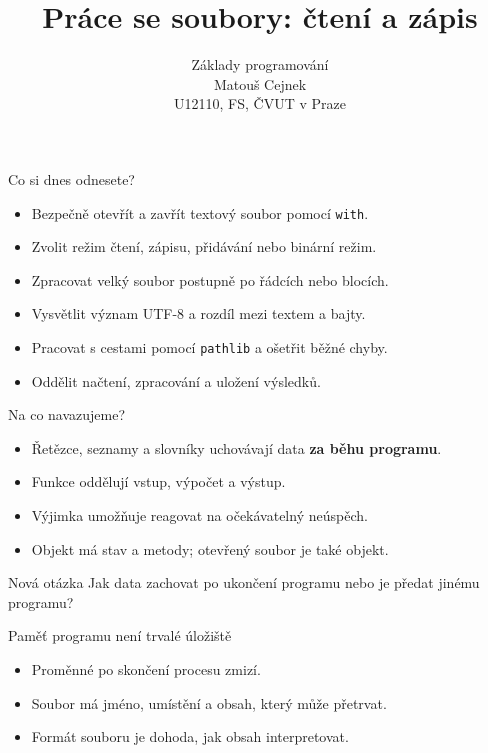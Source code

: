 \documentclass[aspectratio=169]{beamer}
\title{Práce se soubory: čtení a zápis}
\subtitle{Základy programování\\Matouš Cejnek\\U12110, FS, ČVUT v Praze}
\author{}
\institute{}
\date{}
\newcommand{\term}[1]{\textcolor{CodeBlue}{\textbf{#1}}}
\begin{document}
\begin{frame}
  \clearpage\thispagestyle{empty}\titlepage
\end{frame}

\begin{frame}{Co si dnes odnesete?}
  \begin{itemize}
    \item Bezpečně otevřít a zavřít textový soubor pomocí \texttt{with}.
    \item Zvolit režim čtení, zápisu, přidávání nebo binární režim.
    \item Zpracovat velký soubor postupně po řádcích nebo blocích.
    \item Vysvětlit význam UTF-8 a rozdíl mezi textem a bajty.
    \item Pracovat s cestami pomocí \texttt{pathlib} a ošetřit běžné chyby.
    \item Oddělit načtení, zpracování a uložení výsledků.
  \end{itemize}
\end{frame}

\begin{frame}{Na co navazujeme?}
  \begin{itemize}
    \item Řetězce, seznamy a slovníky uchovávají data \term{za běhu programu}.
    \item Funkce oddělují vstup, výpočet a výstup.
    \item Výjimka umožňuje reagovat na očekávatelný neúspěch.
    \item Objekt má stav a metody; otevřený soubor je také objekt.
  \end{itemize}
  \begin{block}{Nová otázka}
    Jak data zachovat po ukončení programu nebo je předat jinému programu?
  \end{block}
\end{frame}

\begin{frame}{Paměť programu není trvalé úložiště}
  \centering
  \vspace{5mm}

  \begin{itemize}
    \item Proměnné po skončení procesu zmizí.
    \item Soubor má jméno, umístění a obsah, který může přetrvat.
    \item Formát souboru je dohoda, jak obsah interpretovat.
  \end{itemize}
\end{frame}
\end{document}
